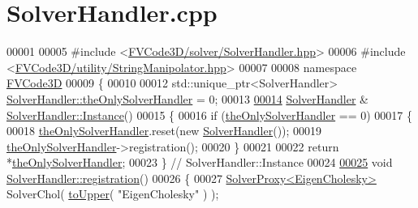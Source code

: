 \hypertarget{SolverHandler_8cpp_source}{}\section{Solver\+Handler.\+cpp}
\label{SolverHandler_8cpp_source}

\begin{DoxyCode}
00001 
00005 \textcolor{preprocessor}{#include <\hyperlink{SolverHandler_8hpp}{FVCode3D/solver/SolverHandler.hpp}>}
00006 \textcolor{preprocessor}{#include <\hyperlink{StringManipolator_8hpp}{FVCode3D/utility/StringManipolator.hpp}>}
00007 
00008 \textcolor{keyword}{namespace }\hyperlink{namespaceFVCode3D}{FVCode3D}
00009 \{
00010 
00012 std::unique\_ptr<SolverHandler> \hyperlink{classFVCode3D_1_1SolverHandler_acdb1d28e913ae90bc3744521893f929e}{SolverHandler::theOnlySolverHandler} = 0;
00013 
\hypertarget{SolverHandler_8cpp_source.tex_l00014}{}\hyperlink{classFVCode3D_1_1SolverHandler_ada712461029e9fdf623260937afe4da3}{00014} \hyperlink{classFVCode3D_1_1SolverHandler}{SolverHandler} & \hyperlink{classFVCode3D_1_1SolverHandler_ada712461029e9fdf623260937afe4da3}{SolverHandler::Instance}()
00015 \{
00016     \textcolor{keywordflow}{if} (\hyperlink{classFVCode3D_1_1SolverHandler_acdb1d28e913ae90bc3744521893f929e}{theOnlySolverHandler} == 0)
00017     \{
00018         \hyperlink{classFVCode3D_1_1SolverHandler_acdb1d28e913ae90bc3744521893f929e}{theOnlySolverHandler}.reset(\textcolor{keyword}{new} \hyperlink{classFVCode3D_1_1SolverHandler_a81166301e1e92747d301a88be5d46ac9}{SolverHandler}());
00019         \hyperlink{classFVCode3D_1_1SolverHandler_acdb1d28e913ae90bc3744521893f929e}{theOnlySolverHandler}->registration();
00020     \}
00021 
00022     \textcolor{keywordflow}{return} *\hyperlink{classFVCode3D_1_1SolverHandler_acdb1d28e913ae90bc3744521893f929e}{theOnlySolverHandler};
00023 \} \textcolor{comment}{// SolverHandler::Instance}
00024 
\hypertarget{SolverHandler_8cpp_source.tex_l00025}{}\hyperlink{classFVCode3D_1_1SolverHandler_a4ad5c3dd8fa9a29281a802a1fa520f29}{00025} \textcolor{keywordtype}{void} \hyperlink{classFVCode3D_1_1SolverHandler_a4ad5c3dd8fa9a29281a802a1fa520f29}{SolverHandler::registration}()
00026 \{
00027     \hyperlink{classFVCode3D_1_1SolverProxy}{SolverProxy<EigenCholesky>}  SolverChol( \hyperlink{namespaceFVCode3D_aab0ceb729c2ff3e7fd288097aee76a59}{toUpper}( \textcolor{stringliteral}{"EigenCholesky"} ) );

\end{DoxyCode}
